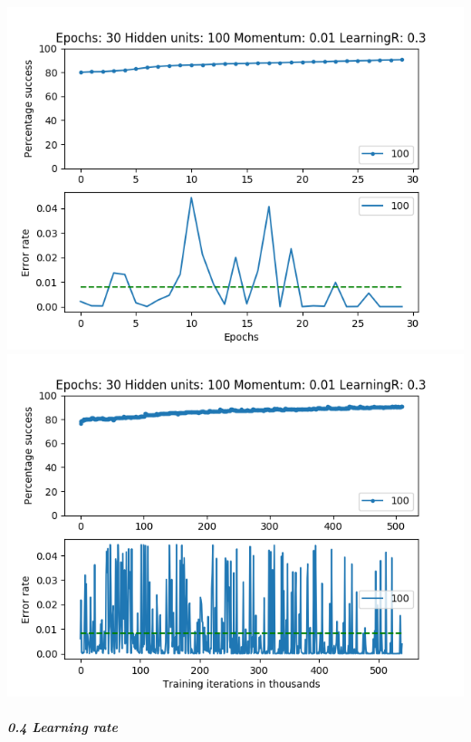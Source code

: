 \documentclass[11pt]{article}
\makeatletter
\def\maxwidth{\ifdim\Gin@nat@width>\linewidth\linewidth
    \else\Gin@nat@width\fi}
\let\Oldincludegraphics\includegraphics
\renewcommand{\includegraphics}[1]{\Oldincludegraphics[width=.8\maxwidth]{#1}}
\makeatother
\begin{document}
\includegraphics{Experiment2/E2_NN_Epoch_Momentum_0.01_30Epochs_100_LR_0.3_Hiddenunits.png}
\includegraphics{Experiment2/E2_NN_Training_Momentum_0.01_30Epochs_100_LR_0.3_Hiddenunits.png}

\hypertarget{learning-rate-4}{%
\subparagraph{0.4 Learning rate}\label{learning-rate-4}}
\end{document}
